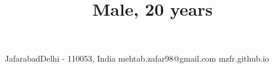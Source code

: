 \title{\normalsize Male, 20 years}

\address
    {H.No. 139, Street No. 7}{Jafarabad}{Delhi - 110053, India}
\email
    {mehtab.zafar98@gmail.com}
\homepage
    {mzfr.github.io}
